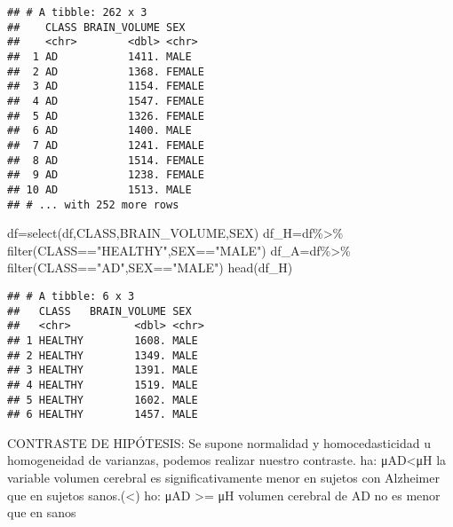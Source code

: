 \documentclass[
]{article}
\newenvironment{Shaded}{\begin{snugshade}}{\end{snugshade}}
\newcommand{\AttributeTok}[1]{\textcolor[rgb]{0.77,0.63,0.00}{#1}}
\newcommand{\FunctionTok}[1]{\textcolor[rgb]{0.00,0.00,0.00}{#1}}
\newcommand{\NormalTok}[1]{#1}
\newcommand{\OtherTok}[1]{\textcolor[rgb]{0.56,0.35,0.01}{#1}}
\newcommand{\SpecialCharTok}[1]{\textcolor[rgb]{0.00,0.00,0.00}{#1}}
\newcommand{\StringTok}[1]{\textcolor[rgb]{0.31,0.60,0.02}{#1}}
\begin{document}
\begin{verbatim}
## # A tibble: 262 x 3
##    CLASS BRAIN_VOLUME SEX   
##    <chr>        <dbl> <chr> 
##  1 AD           1411. MALE  
##  2 AD           1368. FEMALE
##  3 AD           1154. FEMALE
##  4 AD           1547. FEMALE
##  5 AD           1326. FEMALE
##  6 AD           1400. MALE  
##  7 AD           1241. FEMALE
##  8 AD           1514. FEMALE
##  9 AD           1238. FEMALE
## 10 AD           1513. MALE  
## # ... with 252 more rows
\end{verbatim}

\begin{Shaded}
\begin{Highlighting}[]
\NormalTok{df}\OtherTok{=}\FunctionTok{select}\NormalTok{(df,CLASS,BRAIN\_VOLUME,SEX)}
\NormalTok{df\_H}\OtherTok{=}\NormalTok{df}\SpecialCharTok{\%\textgreater{}\%} \FunctionTok{filter}\NormalTok{(CLASS}\SpecialCharTok{==}\StringTok{"HEALTHY"}\NormalTok{,SEX}\SpecialCharTok{==}\StringTok{"MALE"}\NormalTok{)}
\NormalTok{df\_A}\OtherTok{=}\NormalTok{df}\SpecialCharTok{\%\textgreater{}\%} \FunctionTok{filter}\NormalTok{(CLASS}\SpecialCharTok{==}\StringTok{"AD"}\NormalTok{,SEX}\SpecialCharTok{==}\StringTok{"MALE"}\NormalTok{)}
\FunctionTok{head}\NormalTok{(df\_H)}
\end{Highlighting}
\end{Shaded}

\begin{verbatim}
## # A tibble: 6 x 3
##   CLASS   BRAIN_VOLUME SEX  
##   <chr>          <dbl> <chr>
## 1 HEALTHY        1608. MALE 
## 2 HEALTHY        1349. MALE 
## 3 HEALTHY        1391. MALE 
## 4 HEALTHY        1519. MALE 
## 5 HEALTHY        1602. MALE 
## 6 HEALTHY        1457. MALE
\end{verbatim}

CONTRASTE DE HIPÓTESIS: Se supone normalidad y homocedasticidad u
homogeneidad de varianzas, podemos realizar nuestro contraste. ha:
μAD\textless μH la variable volumen cerebral es significativamente menor
en sujetos con Alzheimer que en sujetos sanos.(\textless) ho: μAD
\textgreater= μH volumen cerebral de AD no es menor que en sanos

\begin{Shaded}
\end{Shaded}
\end{document}
